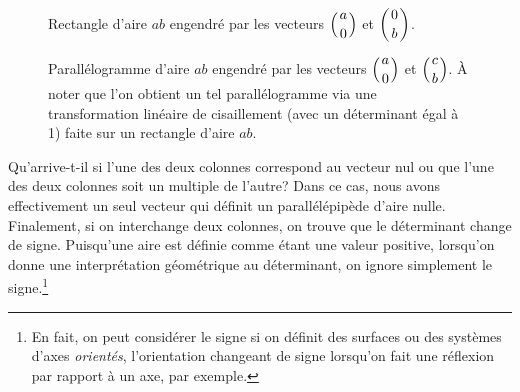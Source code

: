 \begin{figure}[h]
\begin{minipage}{0.45\textwidth}
\caption{Rectangle d'aire $ab$ engendré par les vecteurs
$\displaystyle \left( a\atop 0\right)$ et
$\displaystyle \left(0 \atop b\right)$.
}
\end{minipage}
\hfill
\begin{minipage}{0.45\textwidth}
\caption{Parallélogramme d'aire $ab$ engendré par les vecteurs
$\displaystyle \left( a\atop 0\right)$ et
$\displaystyle \left(c \atop b\right)$. À noter que
l'on obtient un tel parallélogramme via une transformation
linéaire de cisaillement (avec un déterminant égal à 1) faite sur
un rectangle d'aire $ab$.
}
\end{minipage}
\end{figure}
Qu'arrive-t-il si l'une des deux colonnes correspond au vecteur nul
ou que l'une des deux colonnes soit un multiple de l'autre?  
Dans ce cas, nous avons effectivement un seul vecteur qui définit
un parallélépipède d'aire nulle.
Finalement, si on interchange deux colonnes, on trouve que le
déterminant change de signe.  Puisqu'une aire est définie
comme étant une valeur positive, lorsqu'on donne une
interprétation géométrique au déterminant, on ignore
simplement le signe.\footnote{En fait, on peut considérer le signe
si on définit des surfaces ou des systèmes d'axes \textit{orientés},
l'orientation changeant de signe lorsqu'on fait une réflexion par
rapport à un axe, par exemple.}

